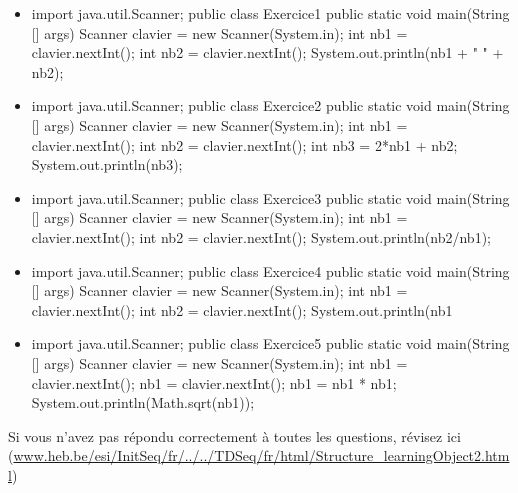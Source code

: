 \documentclass[11pt,a4paper]{article}
\begin{document}
					\begin{itemize}
				
			\item \begin{Java}
import java.util.Scanner;
public class Exercice1 {
    public static void main(String [] args) {
        Scanner clavier = new Scanner(System.in);
        int nb1 = clavier.nextInt();
        int nb2 = clavier.nextInt();
        System.out.println(nb1 + " " + nb2);
    }
}
        \end{Java} \textcolor{gray}{\underline{\hspace*{2em}}} 
			\item \begin{Java}
import java.util.Scanner;
public class Exercice2 {
    public static void main(String [] args) {
        Scanner clavier = new Scanner(System.in);
        int nb1 = clavier.nextInt();
        int nb2 = clavier.nextInt();
        int nb3 = 2*nb1 + nb2;
        System.out.println(nb3);
    }
}
									\end{Java} \textcolor{gray}{\underline{\hspace*{1em}}} 
			\item \begin{Java}
import java.util.Scanner;
public class Exercice3 {
    public static void main(String [] args) {
        Scanner clavier = new Scanner(System.in);
        int nb1 = clavier.nextInt();
        int nb2 = clavier.nextInt();
        System.out.println(nb2/nb1);
    }
}
        \end{Java} \textcolor{gray}{\underline{\hspace*{1em}}} 
			\item \begin{Java}
import java.util.Scanner;
public class Exercice4 {
    public static void main(String [] args) {
        Scanner clavier = new Scanner(System.in);
        int nb1 = clavier.nextInt();
        int nb2 = clavier.nextInt();
        System.out.println(nb1%
    }
}
        \end{Java} \textcolor{gray}{\underline{\hspace*{1em}}} 
			\item \begin{Java}
import java.util.Scanner;
public class Exercice5 {
    public static void main(String [] args) {
        Scanner clavier = new Scanner(System.in);
        int nb1 = clavier.nextInt();
        nb1 = clavier.nextInt();
        nb1 = nb1 * nb1;
        System.out.println(Math.sqrt(nb1));
    }
}
        \end{Java} \textcolor{gray}{\underline{\hspace*{1em}}} 
					\end{itemize}
				Si vous n'avez pas r\'epondu correctement \`a toutes les questions, 
        r\'evisez ici (\url{www.heb.be/esi/InitSeq/fr/../../TDSeq/fr/html/Structure\_learningObject2.html})
            \par
\end{document}
